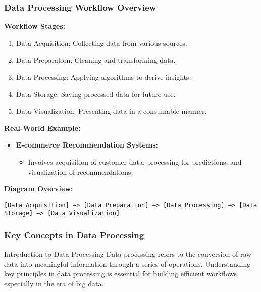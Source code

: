 \documentclass[aspectratio=169]{beamer}
\begin{document}
\begin{frame}[fragile]
    \frametitle{Data Processing Workflow Overview}
    
    \textbf{Workflow Stages:}
    \begin{enumerate}
        \item Data Acquisition: Collecting data from various sources.
        \item Data Preparation: Cleaning and transforming data.
        \item Data Processing: Applying algorithms to derive insights.
        \item Data Storage: Saving processed data for future use.
        \item Data Visualization: Presenting data in a consumable manner.
    \end{enumerate}
    
    \textbf{Real-World Example:}
    \begin{itemize}
        \item \textbf{E-commerce Recommendation Systems:} 
        \begin{itemize}
            \item Involves acquisition of customer data, processing for predictions, and visualization of recommendations.
        \end{itemize}
    \end{itemize}
    
    \textbf{Diagram Overview:}
    \begin{center}
        \texttt{[Data Acquisition] --> [Data Preparation] --> [Data Processing] --> [Data Storage] --> [Data Visualization]}
    \end{center}
\end{frame}

\begin{frame}[fragile]
    \frametitle{Key Concepts in Data Processing}
    \begin{block}{Introduction to Data Processing}
        Data processing refers to the conversion of raw data into meaningful information through a series of operations. 
        Understanding key principles in data processing is essential for building efficient workflows, especially in the era of big data.
    \end{block}
\end{frame}
\end{document}
